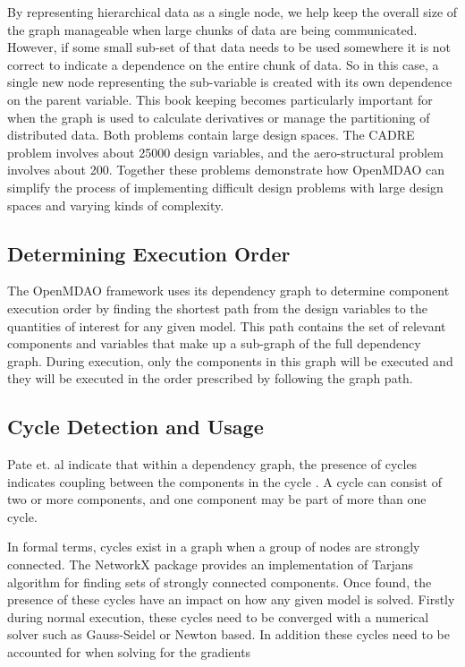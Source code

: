 \documentclass[]{aiaa-tc} %
\begin{document}
    By representing hierarchical data as a single node, we help keep the overall size of the graph manageable
    when large chunks of data are being communicated. However, if some small sub-set of that data needs to be
    used somewhere it is not correct to indicate a dependence on the entire chunk of data. So in this case, a
    single new node representing the sub-variable is created with its own dependence on the parent variable.
    This book keeping becomes particularly important for when the graph is used to calculate derivatives or
    manage the partitioning of distributed data. Both problems contain large design spaces. The CADRE problem 
    involves about 25000 design variables, and the aero-structural problem involves about 200. 
    Together these problems demonstrate how OpenMDAO can simplify the process of implementing difficult 
    design problems with large design spaces and varying kinds of complexity. 


    \subsection{Determining Execution Order}

    The OpenMDAO framework uses its dependency graph to determine component execution order by finding the 
    shortest path from the design variables to the quantities of interest for any given model\cite{openmdao_derivatives}. 
    This path contains the set of relevant components and variables that make up a sub-graph of the full
    dependency graph. During execution, only the components in this graph will be executed and they will be executed 
    in the order prescribed by following the graph path. 

    \subsection{Cycle Detection and Usage}
    Pate et. al indicate that within a dependency graph, the presence of cycles indicates coupling between
    the components in the cycle \cite{graph_problem2013}. A cycle can consist of two or more components, and
    one component may be part of more than one cycle.

    In formal terms, cycles exist in a graph when a group of nodes are strongly connected. The NetworkX package
    provides an implementation of Tarjans algorithm for finding sets of strongly connected
    components\cite{tarjan1972depth,nuutila1994finding}. Once found, the presence of these cycles
    have an impact on how any given model is solved. Firstly during normal execution, these cycles
    need to be converged with a numerical solver such as Gauss-Seidel or Newton based. 
    In addition these cycles need to be accounted for when solving for the gradients 
\end{document}

